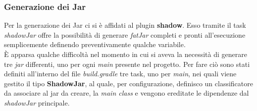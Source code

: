 	\subsubsection{Generazione dei Jar} 
	  Per la generazione dei Jar ci si è affidati al plugin \textbf{shadow}. Esso tramite il task \textit{shadowJar}
	  offre la possibilità di generare \textit{fatJar} completi e pronti all'esecuzione semplicemente definendo preventivamente qualche variabile. \\
	  È apparsa qualche difficoltà nel momento in cui si aveva la necessità di generare tre \textit{jar} differenti, uno per ogni \textit{main} presente nel progetto. 
	  Per fare ciò sono stati definiti all'interno del file \textit{build.gradle} tre task, uno per \textit{main}, nei quali viene gestito il tipo \textbf{ShadowJar}, 
	  al quale, per configurazione, definisco un classificatore da associare al jar da creare, la \textit{main class} 
	  e vengono ereditate le dipendenze dal \textit{shadowJar} principale.
	  

